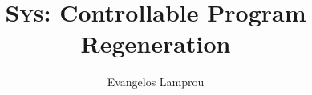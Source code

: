 \documentclass[sigplan]{acmart}
\def\eg{{\em e.g.}, }
\newcommand{\sys}{{\scshape Sys}\xspace}
\begin{document}
\title{\sys: Controllable Program Regeneration}
\author{Evangelos Lamprou}




\begin{abstract}
\end{abstract}



\maketitle
\end{document}
